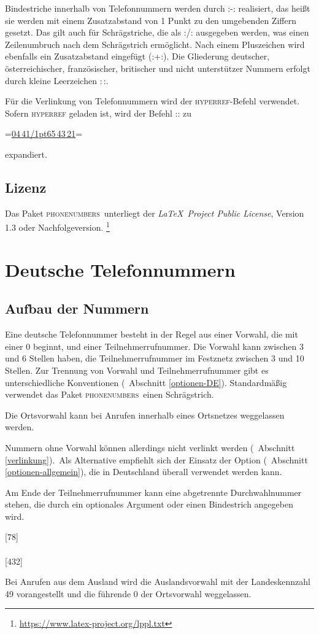 \documentclass[numbers=noenddot]{scrreprt}
\newcommand\Abschnittsliteratur[1]{\bgroup
\small
\raggedright
\printbibliography[heading=subbibnumbered,keyword=#1]
\egroup}
\newcommand*\Paket[1]{\textsc{#1}}
\newcommand\phone{\textcolor{cnltx}{\Paket{phone\-numbers}}}
\newcommand\UeberschriftAufbau{\section{Aufbau der Nummern}}
\newcommand\KeineVerlinkung{Nummern ohne Vorwahl können allerdings nicht verlinkt werden
\vglAbschnitt{verlinkung}.}
\newcommand*\vglAbschnitt[1]{(\cf\ Abschnitt \ref{#1})}
\newcommand*\AufbauDEATA[6]{Eine #1 Telefonnummer besteht in der Regel aus einer Vorwahl, die mit einer 0 beginnt, und einer Teilnehmerrufnummer. Die Vorwahl kann zwischen #2 und #3 Stellen haben, die Teilnehmerrufnummer im Festznetz zwischen #4 und #5 Stellen. Zur Trennung von Vorwahl und Teilnehmerrufnummer gibt es unterschiedliche Konventionen
\vglAbschnitt{#6}.
Standardmäßig verwendet das Paket \phone\ einen Schrägstrich.}
\newcommand\AufbauDEATB{Die Ortsvorwahl kann bei Anrufen innerhalb eines Ortsnetzes weggelassen werden.}
\newcommand\AufbauDEATC[1]{\KeineVerlinkung\ Als Alternative empfiehlt sich der Einsatz der Option \option{home-area-code}
\vglAbschnitt{optionen-allgemein},
die in #1 überall verwendet werden kann.\par
Am Ende der Teilnehmerrufnummer kann eine abgetrennte Durchwahlnummer stehen, die durch ein optionales Argument oder einen Bindestrich angegeben wird.}
\newcommand*\AufbauDEATD[1]{Bei Anrufen aus dem Ausland wird die Auslandsvorwahl mit der Landeskennzahl #1 vorangestellt und die führende 0 der Ortsvorwahl weggelassen.}
\begin{document}
Bindestriche innerhalb von Telefonnummern werden durch
\verbcode:\kern1pt-\kern1pt: realisiert, das heißt sie werden mit einem Zusatzabstand von 1 Punkt zu den umgebenden Ziffern gesetzt. Das gilt auch für Schrägstriche, die als
\verbcode:\kern1pt\slash\kern1pt: ausgegeben werden, was einen Zeilenumbruch nach dem Schrägstrich ermöglicht. Nach einem Pluszeichen wird ebenfalls ein Zusatzabstand eingefügt
(\verbcode:+\kern1pt:).
Die Gliederung deutscher, österreichischer, französischer, britischer und nicht unterstützer Nummern erfolgt durch kleine Leerzeichen
\verbcode:\,:.

Für die Verlinkung von Telefonnummern wird der \Paket{hyperref}-Befehl  verwendet. Sofern \Paket{hyperref} geladen ist, wird der Befehl
\verbcode::
zu
\begin{center}
\verbcode=\href{tel:+49441654321}{04\,41\kern1pt\slash\kern1pt65\,43\,21}=
\end{center}
expandiert.

\section{Lizenz}
Das Paket \phone\ unterliegt der
\emph{\LaTeX\ Project Public License},
Version 1.3 oder Nachfolgeversion.%
\footnote{\url{https://www.latex-project.org/lppl.txt}}

\Abschnittsliteratur{general}

\chapter{Deutsche Telefonnummern}
\UeberschriftAufbau
\AufbauDEATA{deutsche}{3}{6}{3}{10}{optionen-DE}
\begin{sidebyside}
\end{sidebyside}

\AufbauDEATB
\begin{sidebyside}
\end{sidebyside}
\AufbauDEATC{Deutschland}
\begin{sidebyside}
  [78] \\
   \\
  [432] \\
\end{sidebyside}

\AufbauDEATD{49}
\begin{sidebyside}
\end{sidebyside}
\end{document}
